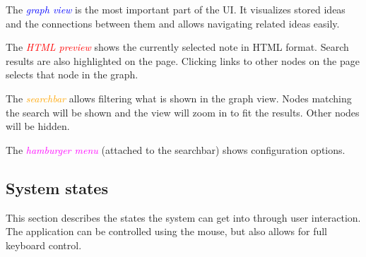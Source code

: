 \documentclass{article}
\begin{document}
\begin{center}


\end{center}

The \textcolor{blue}{\emph{graph view}} is the most important part of the UI. It visualizes stored ideas and the connections between them and allows navigating related ideas easily.

The \textcolor{red}{\emph{HTML preview}} shows the currently selected note in HTML format. Search results are also highlighted on the page. Clicking links to other nodes on the page selects that node in the graph.

The \textcolor{orange}{\emph{searchbar}} allows filtering what is shown in the graph view. Nodes matching the search will be shown and the view will zoom in to fit the results. Other nodes will be hidden.

The \textcolor{magenta}{\emph{hamburger menu}} (attached to the searchbar) shows configuration options.

\newpage

\subsection{System states} %

This section describes the states the system can get into through user interaction. The application can be controlled using the mouse, but also allows for full keyboard control.
\end{document}
